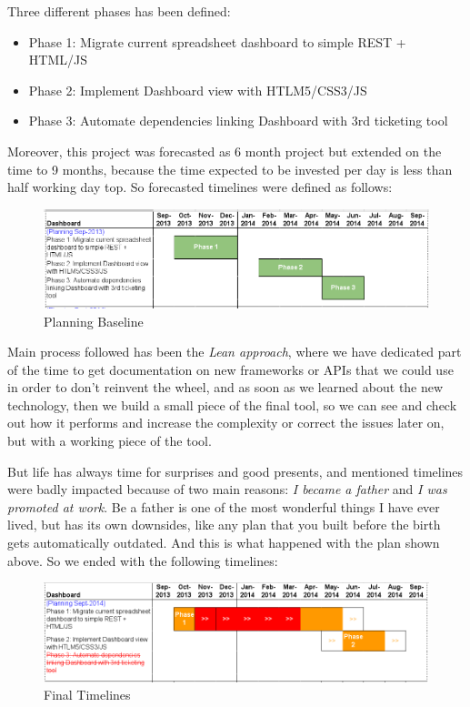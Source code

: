 \documentclass[a4paper,12pt,english]{book}
\begin{document}
Three different phases has been defined:
\begin{itemize}
	\item Phase 1: Migrate current spreadsheet dashboard to simple REST +
	HTML/JS
	\item Phase 2: Implement Dashboard view with HTLM5/CSS3/JS
	\item Phase 3: Automate dependencies linking Dashboard with 3rd ticketing
	tool
\end{itemize}

Moreover, this project was forecasted as 6 month project but extended on
the time to 9 months, because the time expected to be invested per day is less
than half working day top. So forecasted timelines were defined as follows:

\begin{figure}[ht!]
	\centering
   	\includegraphics[width=1\textwidth]{./resources/planning_baseline_12pt.png}
   	\caption{Planning Baseline}
   	\label{f_planning_baseline}
\end{figure}

Main process followed has been the \emph{Lean approach}, where we have
dedicated part of the time to get documentation on new frameworks or APIs
that we could use in order to don't reinvent the wheel, and as soon as we
learned about the new technology, then we build a small piece of the final tool,
so we can see and check out how it performs and increase the complexity or
correct the issues later on, but with a working piece of the tool.

But life has always time for surprises and good presents, and mentioned
timelines were badly impacted because of two main reasons: \emph{I became a father} and
\emph{I was promoted at work}. Be a father is one of the most wonderful things
I have ever lived, but has its own downsides, like any plan that you
built before the birth gets automatically outdated. And this is what happened
with the plan shown above. So we ended with the following timelines: 

\begin{figure}[ht!]
	\centering
   	\includegraphics[width=1\textwidth]{./resources/planning_sep2014_12pt.png}
   	\caption{Final Timelines}
   	\label{f_planning_final}
\end{figure}
\end{document}
